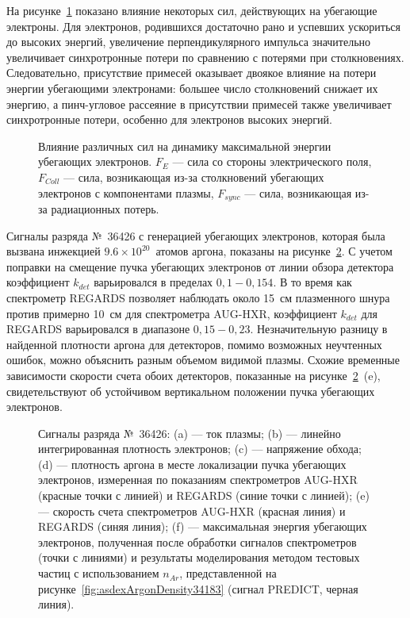 На рисунке~\ref{fig:asdexForcesEffectsSimulation} показано влияние некоторых сил, действующих на убегающие электроны. Для электронов, родившихся достаточно рано и успевших ускориться до высоких энергий, увеличение перпендикулярного импульса значительно увеличивает синхротронные потери по сравнению с потерями при столкновениях. Следовательно, присутствие примесей оказывает двоякое влияние на потери энергии убегающими электронами: большее число столкновений снижает их энергию, а пинч-угловое рассеяние в присутствии примесей также увеличивает синхротронные потери, особенно для электронов высоких энергий.

\begin{figure}[ht!]
  \caption{ Влияние различных сил на динамику максимальной энергии убегающих электронов. $F_E$ --- сила со стороны электрического поля, $F_{Coll}$ --- сила, возникающая из-за столкновений убегающих электронов с компонентами плазмы, $F_{sync}$ --- сила, возникающая из-за радиационных потерь.~\cite{Shevelev2021} }
  \label{fig:asdexForcesEffectsSimulation}
\end{figure}

Сигналы разряда №~36426 с генерацией убегающих электронов, которая была вызвана инжекцией $9.6 \times 10^{20}$~атомов аргона, показаны на рисунке~\ref{fig:asdexPlasmaParamsPulse36426}. С учетом поправки на смещение пучка убегающих электронов от линии обзора детектора коэффициент $k_{det}$ варьировался в пределах $0,1-0,154$. В то время как спектрометр REGARDS позволяет наблюдать около 15~см плазменного шнура против примерно 10~см для спектрометра AUG-HXR, коэффициент $k_{det}$ для REGARDS варьировался в диапазоне $0,15-0,23$. Незначительную разницу в найденной плотности аргона для детекторов, помимо возможных неучтенных ошибок, можно объяснить разным объемом видимой плазмы. Схожие временные зависимости скорости счета обоих детекторов, показанные на рисунке~\ref{fig:asdexPlasmaParamsPulse36426}~(e), свидетельствуют об устойчивом вертикальном положении пучка убегающих электронов.

\begin{figure}[ht!]
  \caption{ Сигналы разряда №~36426: (a) --- ток плазмы; (b) --- линейно интегрированная плотность электронов; (c) --- напряжение обхода; (d) --- плотность аргона в месте локализации пучка убегающих электронов, измеренная по показаниям спектрометров AUG-HXR (красные точки с линией) и REGARDS (синие точки с линией); (e) --- скорость счета спектрометров AUG-HXR (красная линия) и REGARDS (синяя линия); (f) --- максимальная энергия убегающих электронов, полученная после обработки сигналов спектрометров (точки с линиями) и результаты моделирования методом тестовых частиц с использованием $n_{Ar}$, представленной на рисунке~\ref{fig:asdexArgonDensity34183} (сигнал PREDICT, черная линия).~\cite{Shevelev2021} }
  \label{fig:asdexPlasmaParamsPulse36426}
\end{figure}


